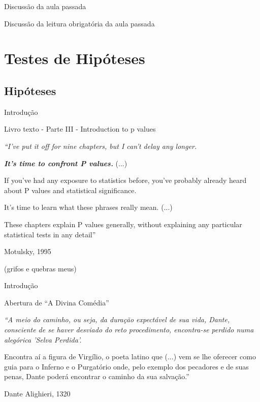 \documentclass{beamer}
\begin{document}


\begin{frame}{\scriptsize Discussão da aula passada}
  \begin{block}{}
    Discussão da leitura obrigatória da aula passada
  \end{block}
\end{frame}

\section{Testes de Hipóteses}

\subsection{Hipóteses}

\begin{frame}{\scriptsize Introdução}
  \begin{block}{{\small Livro texto - Parte III - Introduction to p values}}
    \footnotesize

    {\em ``I've put it off for nine chapters, but I can't delay any
      longer.

      {\bf \em It's time to confront P values.} (...)


      \bigskip

      If you've had any exposure to statistics before, you've probably
      already heard about P values and statistical significance.

      It's time to learn what these phrases really mean. (...)

      \bigskip

      These chapters explain P values generally, without explaining
      any particular statistical tests in any detail''}
  \end{block}
  \hfill {\small Motulsky, 1995}

  \hfill {\scriptsize (grifos e quebras meus)}
\end{frame}

\begin{frame}{\scriptsize Introdução}
  \begin{block}{Abertura de ``A Divina Comédia''}
    \footnotesize
    {\em ``A meio do caminho, ou seja, da duração expectável de sua vida, Dante, consciente de se haver desviado do reto procedimento, encontra-se perdido numa alegórica 'Selva Perdida'.

      \bigskip
      Encontra aí a figura de Virgílio, o poeta latino que (...) vem se lhe oferecer como guia para o Inferno e o Purgatório onde, pelo exemplo dos pecadores e de suas penas, Dante poderá encontrar o caminho da sua salvação.''}
  \end{block}
\hfill {\small Dante Alighieri, 1320}
\end{frame}
\end{document}
